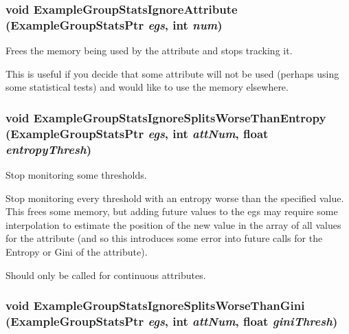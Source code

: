 \subsubsection{\setlength{\rightskip}{0pt plus 5cm}void Example\-Group\-Stats\-Ignore\-Attribute ({\bf Example\-Group\-Stats\-Ptr} {\em egs}, int {\em num})}\label{ExampleGroupStats_8h_a29}


Frees the memory being used by the attribute and stops tracking it. 

This is useful if you decide that some attribute will not be used (perhaps using some statistical tests) and would like to use the memory elsewhere. 
\subsubsection{\setlength{\rightskip}{0pt plus 5cm}void Example\-Group\-Stats\-Ignore\-Splits\-Worse\-Than\-Entropy ({\bf Example\-Group\-Stats\-Ptr} {\em egs}, int {\em att\-Num}, float {\em entropy\-Thresh})}\label{ExampleGroupStats_8h_a50}


Stop monitoring some thresholds. 

Stop monitoring every threshold with an entropy worse than the specified value. This frees some memory, but adding future values to the egs may require some interpolation to estimate the position of the new value in the array of all values for the attribute (and so this introduces some error into future calls for the Entropy or Gini of the attribute).

Should only be called for continuous attributes. 
\subsubsection{\setlength{\rightskip}{0pt plus 5cm}void Example\-Group\-Stats\-Ignore\-Splits\-Worse\-Than\-Gini ({\bf Example\-Group\-Stats\-Ptr} {\em egs}, int {\em att\-Num}, float {\em gini\-Thresh})}\label{ExampleGroupStats_8h_a51}


